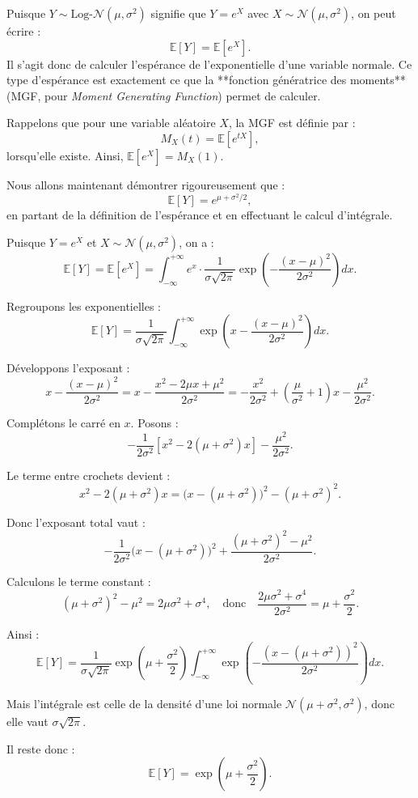\begin{intuitionbox}
Puisque \( Y \sim \text{Log-}\mathcal{N}(\mu, \sigma^2) \) signifie que \( Y = e^X \) avec \( X \sim \mathcal{N}(\mu, \sigma^2) \), on peut écrire :
\[
\mathbb{E}[Y] = \mathbb{E}[e^X].
\]
Il s’agit donc de calculer l’espérance de l’exponentielle d’une variable normale. Ce type d’espérance est exactement ce que la **fonction génératrice des moments** (MGF, pour \textit{Moment Generating Function}) permet de calculer.

Rappelons que pour une variable aléatoire \( X \), la MGF est définie par :
\[
M_X(t) = \mathbb{E}[e^{tX}],
\]
lorsqu’elle existe. Ainsi, \( \mathbb{E}[e^X] = M_X(1) \).
\end{intuitionbox}

\begin{proofbox}
Nous allons maintenant démontrer rigoureusement que :
\[
\mathbb{E}[Y] = e^{\mu + \sigma^2/2},
\]
en partant de la définition de l’espérance et en effectuant le calcul d’intégrale.

Puisque \( Y = e^X \) et \( X \sim \mathcal{N}(\mu, \sigma^2) \), on a :
\[
\mathbb{E}[Y] = \mathbb{E}[e^X] = \int_{-\infty}^{+\infty} e^x \cdot \frac{1}{\sigma\sqrt{2\pi}} \exp\!\left( -\frac{(x - \mu)^2}{2\sigma^2} \right) dx.
\]

Regroupons les exponentielles :
\[
\mathbb{E}[Y] = \frac{1}{\sigma\sqrt{2\pi}} \int_{-\infty}^{+\infty} \exp\!\left( x - \frac{(x - \mu)^2}{2\sigma^2} \right) dx.
\]

Développons l’exposant :
\[
x - \frac{(x - \mu)^2}{2\sigma^2}
= x - \frac{x^2 - 2\mu x + \mu^2}{2\sigma^2}
= -\frac{x^2}{2\sigma^2} + \left( \frac{\mu}{\sigma^2} + 1 \right)x - \frac{\mu^2}{2\sigma^2}.
\]

Complétons le carré en \( x \). Posons :
\[
-\frac{1}{2\sigma^2} \left[ x^2 - 2(\mu + \sigma^2)x \right] - \frac{\mu^2}{2\sigma^2}.
\]

Le terme entre crochets devient :
\[
x^2 - 2(\mu + \sigma^2)x = \big(x - (\mu + \sigma^2)\big)^2 - (\mu + \sigma^2)^2.
\]

Donc l’exposant total vaut :
\[
-\frac{1}{2\sigma^2} \big(x - (\mu + \sigma^2)\big)^2 + \frac{(\mu + \sigma^2)^2 - \mu^2}{2\sigma^2}.
\]

Calculons le terme constant :
\[
(\mu + \sigma^2)^2 - \mu^2 = 2\mu\sigma^2 + \sigma^4,
\quad \text{donc} \quad
\frac{2\mu\sigma^2 + \sigma^4}{2\sigma^2} = \mu + \frac{\sigma^2}{2}.
\]

Ainsi :
\[
\mathbb{E}[Y] = \frac{1}{\sigma\sqrt{2\pi}} \exp\!\left( \mu + \frac{\sigma^2}{2} \right) \int_{-\infty}^{+\infty} \exp\!\left( -\frac{(x - (\mu + \sigma^2))^2}{2\sigma^2} \right) dx.
\]

Mais l’intégrale est celle de la densité d’une loi normale \( \mathcal{N}(\mu + \sigma^2, \sigma^2) \), donc elle vaut \( \sigma\sqrt{2\pi} \).

Il reste donc :
\[
\mathbb{E}[Y] = \exp\!\left( \mu + \frac{\sigma^2}{2} \right).
\]

\end{proofbox}


